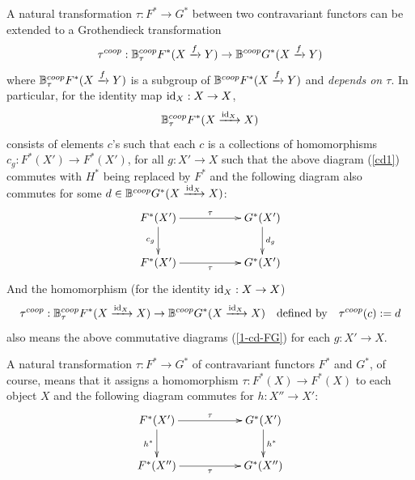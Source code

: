 \documentclass[a4paper]{amsart}
\begin{document}
A natural transformation $\tau: F^* \to G^*$ between two contravariant functors can be extended to a Grothendieck transformation
$$\tau^{coop}: \mathbb B^{coop}_{\tau}F^*(X \xrightarrow f Y) \to \mathbb B^{coop}G^*(X \xrightarrow f Y)$$
where $\mathbb B^{coop}_{\tau}F^*(X \xrightarrow f Y)$ is a subgroup of $\mathbb B^{coop}F^*(X \xrightarrow f Y)$
and \emph{depends on $\tau$}. 
In particular, for the identity map $\operatorname{id}_X:X \to X$, 
$$\mathbb B^{coop}_{\tau}F^*(X \xrightarrow {\operatorname{id}_X} X)$$
consists of elements $c$'s such that each $c$ is a collections of homomorphisms $c_g:F^*(X') \to F^*(X')$, for all $g:X' \to X$ such that the above diagram (\ref{cd1}) commutes with $H^*$ being replaced by $F^*$ and the following diagram also commutes for some $d \in \mathbb B^{coop}G^*(X \xrightarrow {\operatorname{id}_X} X)$:
\begin{equation}\label{1-cd-FG}
\xymatrix
{ F^*(X') \ar[d]_{c_g } \ar[rr]^{\tau} && G^*(X') \ar[d]^{d_g}  \\
F^*(X') \ar[rr]_{\tau} && G^*(X') \\
}
\end{equation}
And the homomorphism (for the identity $\operatorname{id}_X:X \to X$)
\begin{equation}\label{tau-c-d}
\tau^{coop}: \mathbb B^{coop}_{\tau}F^*(X \xrightarrow {\operatorname{id}_X} X) \to \mathbb B^{coop}G^*(X \xrightarrow {\operatorname{id}_X} X) \quad \text{defined by} \quad \tau^{coop}(c):=d
\end{equation}
also means the above commutative diagrams (\ref{1-cd-FG}) for each $g:X' \to X$. 

A natural transformation $\tau: F^* \to G^*$ of contravariant functors $F^*$ and $G^*$, of course, means that it assigns a homomorphism $\tau: F^*(X) \to F^*(X)$ to each object $X$ and the following diagram commutes for $h:X'' \to X'$:
\begin{equation}\label{cd-FG-naturaliy}
\xymatrix
{ F^*(X') \ar[d]_{h^*} \ar[rr]^{\tau} && G^*(X') \ar[d]^{h^*}  \\
F^*(X'') \ar[rr]_{\tau} && G^*(X'') \\
}
\end{equation}
\end{document}
